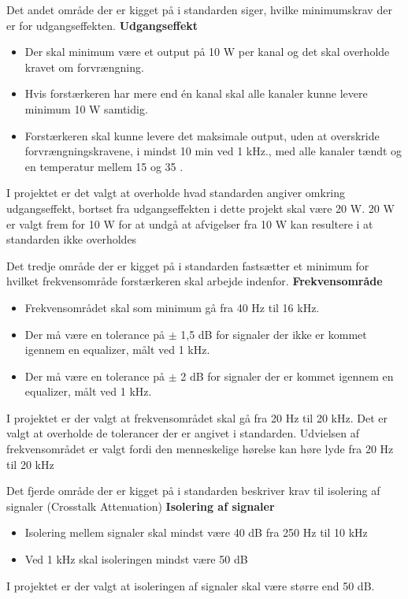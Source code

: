 Det andet område der er kigget på i standarden siger, hvilke minimumskrav der er for udgangseffekten.
\newline
\newline
\textbf{Udgangseffekt}
\begin{itemize}
\item Der skal minimum være et output på 10 W per kanal og det skal overholde kravet om forvrængning.
\item Hvis forstærkeren har mere end én kanal skal alle kanaler kunne levere minimum 10 W samtidig.
\item Forstærkeren skal kunne levere det maksimale output, uden at overskride forvrængningskravene, i mindst 10 min ved 1 kHz., med alle kanaler tændt og en temperatur mellem 15 \celsius og 35 \celsius.
\end{itemize}
I projektet er det valgt at overholde hvad standarden angiver omkring udgangseffekt, bortset fra udgangseffekten i dette projekt skal være 20 W. 20 W er valgt frem for 10 W for at undgå at afvigelser fra 10 W kan resultere i at standarden ikke overholdes


Det tredje område der er kigget på i standarden fastsætter et minimum for hvilket frekvensområde forstærkeren skal arbejde indenfor.
\newline 
\newline
\textbf{Frekvensområde}
\begin{itemize}
\item Frekvensområdet skal som minimum gå fra 40 Hz til 16 kHz.
\item Der må være en tolerance på $\pm$ 1,5 dB for signaler der ikke er kommet igennem en equalizer, målt ved 1 kHz.
\item Der må være en tolerance på $\pm$ 2 dB for signaler der er kommet igennem en equalizer, målt ved 1 kHz.
\end{itemize}
I projektet er der valgt at frekvensområdet skal gå fra 20 Hz til 20 kHz. Det er valgt at overholde de tolerancer der er angivet i standarden. Udvielsen af frekvensområdet er valgt fordi den menneskelige hørelse kan høre lyde fra 20 Hz til 20 kHz

Det fjerde område der er kigget på i standarden beskriver krav til isolering af signaler (Crosstalk Attenuation)
\newline 
\newline
\textbf{Isolering af signaler}
\begin{itemize}
\item Isolering mellem signaler skal mindst være 40 dB fra 250 Hz til 10 kHz
\item Ved 1 kHz skal isoleringen mindst være 50 dB
\end{itemize}
I projektet er der valgt at isoleringen af signaler skal være større end 50 dB.

